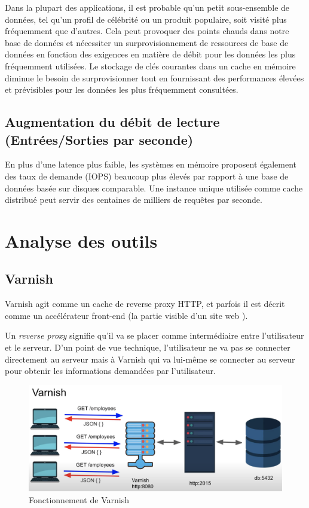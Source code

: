 \documentclass{article}
\begin{document}
Dans la plupart des applications, il est probable qu'un petit sous-ensemble de données, tel qu'un profil de célébrité ou un produit populaire, soit visité plus fréquemment que d'autres. Cela peut provoquer des points chauds dans notre base de données et nécessiter un surprovisionnement de ressources de base de données en fonction des exigences en matière de débit pour les données les plus fréquemment utilisées. Le stockage de clés courantes dans un cache en mémoire diminue le besoin de surprovisionner tout en fournissant des performances élevées et prévisibles pour les données les plus fréquemment consultées.


\subsection{Augmentation du débit de lecture (Entrées/Sorties par seconde)}

En plus d'une latence plus faible, les systèmes en mémoire proposent également des taux de demande (IOPS) beaucoup plus élevés par rapport à une base de données basée sur disques comparable. Une instance unique utilisée comme cache distribué peut servir des centaines de milliers de requêtes par seconde.





\section{Analyse des outils}

\subsection{Varnish}

Varnish agit comme un cache de reverse proxy HTTP, et parfois il est décrit comme un accélérateur front-end (la partie visible d'un site web ).

Un {\it reverse proxy} signifie qu'il va se placer comme intermédiaire entre l'utilisateur et le serveur. D'un point de vue technique, l'utilisateur ne va pas se connecter directement au serveur mais à Varnish qui va lui-même se connecter au serveur pour obtenir les informations demandées par l'utilisateur.
\begin{figure}[h!]
    \centering
    \includegraphics[scale=0.4]{Varnish_schema.png}
    \caption{Fonctionnement de Varnish}
    \label{fig:varnish-schema}
\end{figure}
\end{document}
